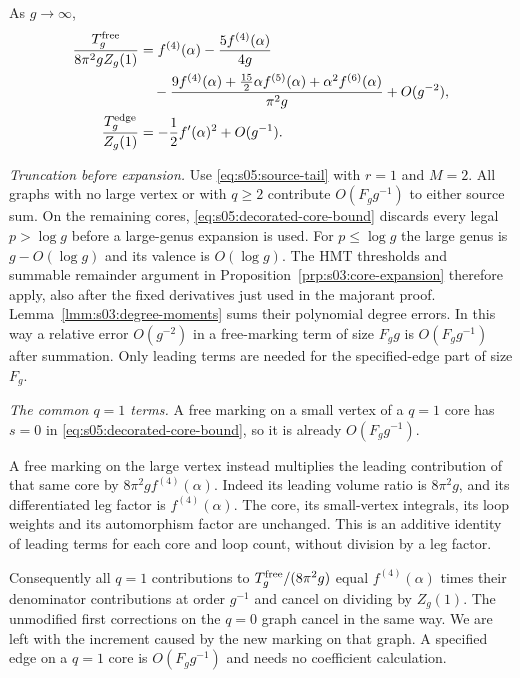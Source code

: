 \begin{lmm}\label{lmm:s05:single-source}
As $g\to\infty$,
\begin{align}
 \frac{T_g^{\rm free}}{8\pi^2gZ_g(1)}
 &=f^{(4)}(\alpha)-\frac{5f^{(4)}(\alpha)}{4g}\notag\\
 &\quad-\frac{9f^{(4)}(\alpha)
          +\tfrac{15}{2}\alpha f^{(5)}(\alpha)
          +\alpha^2 f^{(6)}(\alpha)}{\pi^2g}
          +O(g^{-2}),
 \label{eq:s05:free-ratio}\\
 \frac{T_g^{\rm edge}}{Z_g(1)}
 &=-\frac12 f'(\alpha)^2+O(g^{-1}).
 \label{eq:s05:edge-ratio}
\end{align}
\end{lmm}
\begin{prf}
\emph{Truncation before expansion.}
Use \eqref{eq:s05:source-tail} with $r=1$ and $M=2$.
All graphs with no large vertex or with $q\geq2$ contribute
$O(F_g g^{-1})$ to either source sum. On the remaining cores,
\eqref{eq:s05:decorated-core-bound} discards every legal
$p>\log g$ before a large-genus expansion is used. For
$p\leq\log g$ the large genus is $g-O(\log g)$ and its valence is
$O(\log g)$. The HMT thresholds and summable remainder argument in
Proposition~\ref{prp:s03:core-expansion} therefore apply, also after
the fixed derivatives just used in the majorant proof.
Lemma~\ref{lmm:s03:degree-moments} sums their polynomial degree
errors. In this way a relative error $O(g^{-2})$ in a free-marking
term of size $F_g g$ is $O(F_g g^{-1})$ after summation. Only leading
terms are needed for the specified-edge part of size $F_g$.

\emph{The common $q=1$ terms.}
A free marking on a small vertex of a $q=1$ core has $s=0$ in
\eqref{eq:s05:decorated-core-bound}, so it is already
$O(F_g g^{-1})$.

A free marking on the large vertex instead
multiplies the leading contribution of that same core by
$8\pi^2g f^{(4)}(\alpha)$. Indeed its leading volume ratio is
$8\pi^2g$, and its differentiated leg factor is
$f^{(4)}(\alpha)$. The core, its small-vertex integrals, its
loop weights and its automorphism factor are unchanged.
This is an additive identity of leading terms for each core and
loop count, without division by a leg factor.

Consequently all $q=1$ contributions to $T_g^{\rm free}/(8\pi^2g)$ equal
$f^{(4)}(\alpha)$ times their denominator contributions at order
$g^{-1}$ and cancel on dividing by $Z_g(1)$. The unmodified
first corrections on the $q=0$ graph cancel in the same way.
We are left with the increment caused by the new marking on that
graph. A specified edge on a $q=1$ core is
$O(F_g g^{-1})$ and needs no coefficient calculation.


\end{prf}
